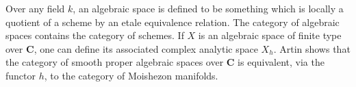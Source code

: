 Over any field $k$, an algebraic space is defined to be something which is locally a quotient of a scheme by an etale equivalence relation. The category of algebraic spaces contains the category of schemes. If $X$ is an algebraic space of finite type over $\mathbf{C}$, one can define its associated complex analytic space $X_h$. Artin shows that the category of smooth proper algebraic spaces over $\mathbf{C}$ is equivalent, via the functor $h$, to the category of Moishezon manifolds.
